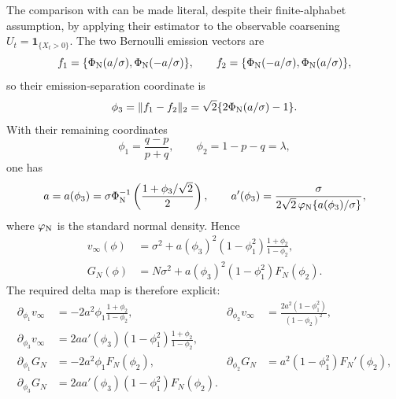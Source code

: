 The comparison with \cite{AbrahamGassiatNaulet2023} can be made literal,
despite their finite-alphabet assumption, by applying their estimator to the
observable coarsening \(U_t=\mathbf 1_{\{X_t>0\}}\).  The two Bernoulli
emission vectors are
\[
 f_1=\{\Phi_{\rm N}(a/\sigma),\Phi_{\rm N}(-a/\sigma)\},\qquad
 f_2=\{\Phi_{\rm N}(-a/\sigma),\Phi_{\rm N}(a/\sigma)\},
\]
so their emission-separation coordinate is
\[
 \phi_3=\|f_1-f_2\|_2
 =\sqrt2\{2\Phi_{\rm N}(a/\sigma)-1\}.
\]
With their remaining coordinates
\[
 \phi_1=\frac{q-p}{p+q},\qquad \phi_2=1-p-q=\lambda,
\]
one has
\[
 a=a(\phi_3)
 =\sigma\Phi_{\rm N}^{-1}
 \left(\frac{1+\phi_3/\sqrt2}{2}\right),\qquad
 a'(\phi_3)=\frac{\sigma}
 {2\sqrt2\,\varphi_{\rm N}\{a(\phi_3)/\sigma\}},
\]
where \(\varphi_{\rm N}\) is the standard normal density.  Hence
\begin{align}
 v_\infty(\phi)
 &=\sigma^2+a(\phi_3)^2(1-\phi_1^2)
 \frac{1+\phi_2}{1-\phi_2},
 \label{eq:agn-map-vphi}\\
 G_N(\phi)
 &=N\sigma^2+a(\phi_3)^2(1-\phi_1^2)F_N(\phi_2).
 \label{eq:agn-map-Gphi}
\end{align}
The required delta map is therefore explicit:
\begin{align}
 \partial_{\phi_1}v_\infty
 &=-2a^2\phi_1\frac{1+\phi_2}{1-\phi_2},
 &
 \partial_{\phi_2}v_\infty
 &=\frac{2a^2(1-\phi_1^2)}{(1-\phi_2)^2},
 \nonumber\\
 \partial_{\phi_3}v_\infty
 &=2aa'(\phi_3)(1-\phi_1^2)
 \frac{1+\phi_2}{1-\phi_2},
 \label{eq:agn-map-grad-v}\\
 \partial_{\phi_1}G_N
 &=-2a^2\phi_1F_N(\phi_2),
 &
 \partial_{\phi_2}G_N
 &=a^2(1-\phi_1^2)F_N'(\phi_2),
 \nonumber\\
 \partial_{\phi_3}G_N
 &=2aa'(\phi_3)(1-\phi_1^2)F_N(\phi_2).
 \label{eq:agn-map-grad-G}
\end{align}

